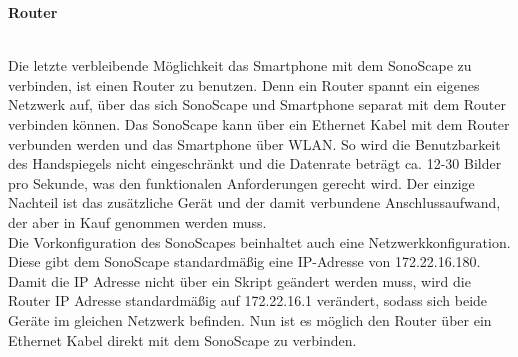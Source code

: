 \begin{large}
\textbf{Router}\\\\
\end{large}
Die letzte verbleibende Möglichkeit das Smartphone mit dem SonoScape zu verbinden, ist einen Router zu benutzen. Denn ein Router spannt ein eigenes Netzwerk auf, über das sich SonoScape und Smartphone separat mit dem Router verbinden können. Das SonoScape kann über ein Ethernet Kabel mit dem Router verbunden werden und das Smartphone über WLAN. So wird die Benutzbarkeit des Handspiegels nicht eingeschränkt und die Datenrate beträgt ca. 12-30 Bilder pro Sekunde, was den funktionalen Anforderungen gerecht wird. Der einzige Nachteil ist das zusätzliche Gerät und der damit verbundene Anschlussaufwand, der aber in Kauf genommen werden muss.\\
Die Vorkonfiguration des SonoScapes beinhaltet auch eine Netzwerkkonfiguration. Diese gibt dem SonoScape standardmäßig eine IP-Adresse von 172.22.16.180. Damit die IP Adresse nicht über ein Skript geändert werden muss, wird die Router IP Adresse standardmäßig auf 172.22.16.1 verändert, sodass sich beide Geräte im gleichen Netzwerk befinden. Nun ist es möglich den Router über ein Ethernet Kabel direkt mit dem SonoScape zu verbinden. 




